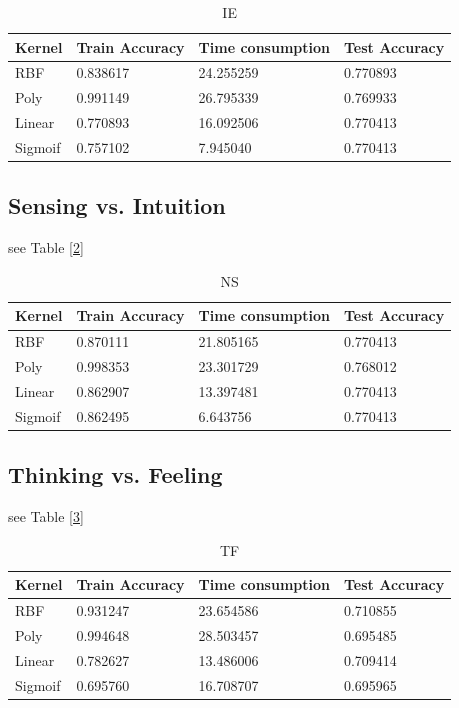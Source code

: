 \documentclass{article}
\begin{document}
\begin{table}
  \caption{IE}
  \label{IE}
  \centering
  \begin{tabular}{llll}
    \toprule
    \cmidrule(r){1-2}
    Kernel     & Train Accuracy   & Time consumption  & Test Accuracy  \\
    \midrule
    RBF & 0.838617  & 24.255259 &   0.770893   \\
    Poly     & 0.991149 & 26.795339 &  0.769933    \\
    Linear     & 0.770893	& 16.092506      & 0.770413  \\
    Sigmoif & 0.757102 & 7.945040 & 0.770413\\
    \bottomrule
  \end{tabular}
\end{table}
\subsection{Sensing  vs. Intuition }

see Table [\ref{NS}]

\begin{table}
  \caption{NS}
  \label{NS}
  \centering
  \begin{tabular}{llll}
    \toprule
    \cmidrule(r){1-2}
    Kernel     & Train Accuracy   & Time consumption  & Test Accuracy  \\
    \midrule
    RBF & 0.870111  & 21.805165 &   0.770413   \\
    Poly     & 0.998353 & 23.301729 &  0.768012    \\
    Linear     & 0.862907	& 13.397481      & 0.770413  \\
    Sigmoif & 0.862495 & 6.643756 & 0.770413\\
    \bottomrule
  \end{tabular}
\end{table}

\subsection{Thinking  vs. Feeling }
see Table [\ref{TF}]

\begin{table}
  \caption{TF}
  \label{TF}
  \centering
  \begin{tabular}{llll}
    \toprule
    \cmidrule(r){1-2}
    Kernel     & Train Accuracy   & Time consumption  & Test Accuracy  \\
    \midrule
    RBF & 0.931247	  & 23.654586 &   0.710855   \\
    Poly     & 0.994648 & 28.503457 &  0.695485    \\
    Linear     & 0.782627	& 13.486006      & 0.709414  \\
    Sigmoif & 0.695760 & 16.708707 & 0.695965\\
    \bottomrule
  \end{tabular}
\end{table}
\end{document}
